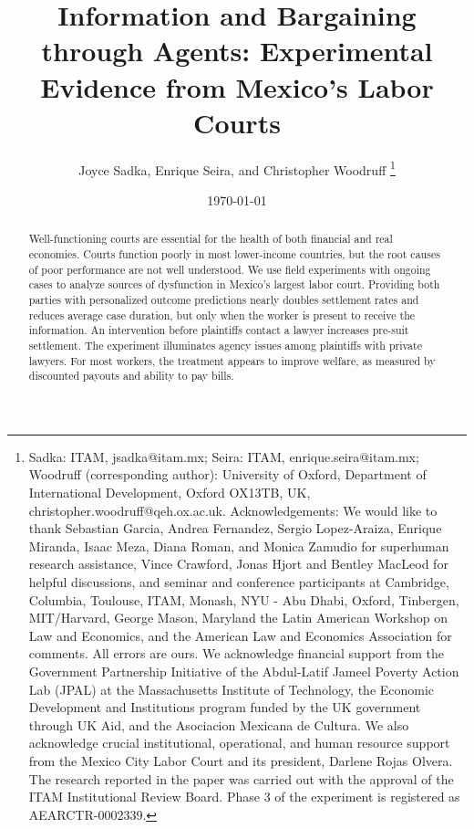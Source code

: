 \documentclass[11pt, a4paper]{article}
\begin{document}
\title{Information and Bargaining through Agents: Experimental Evidence from Mexico's Labor Courts}


\author{Joyce Sadka,  Enrique Seira, and Christopher Woodruff  \thanks{\protect\linespread{1}\protect\selectfont Sadka: ITAM, jsadka@itam.mx;  
Seira: ITAM, enrique.seira@itam.mx; Woodruff (corresponding author): University of Oxford, Department of International Development, Oxford OX13TB, UK, christopher.woodruff@qeh.ox.ac.uk. Acknowledgements: We would like to thank Sebastian Garcia, Andrea Fernandez, Sergio Lopez-Araiza, Enrique Miranda, Isaac Meza, Diana Roman, and Monica Zamudio for superhuman research assistance, Vince Crawford, Jonas Hjort and Bentley MacLeod for helpful discussions, and seminar and conference participants at Cambridge, Columbia, Toulouse, ITAM, Monash, NYU - Abu Dhabi, Oxford, Tinbergen, MIT/Harvard, George Mason, Maryland the Latin American Workshop on Law and Economics, and the American Law and Economics Association for comments. All errors are ours. We acknowledge financial support from the Government Partnership Initiative of the Abdul-Latif Jameel Poverty Action Lab (JPAL) at the Massachusetts Institute of Technology, the Economic Development and Institutions program funded by the UK government through UK Aid, and the Asociacion Mexicana de Cultura. We also acknowledge crucial institutional, operational, and human resource support from the Mexico City Labor Court and its president, Darlene Rojas Olvera. The research reported in the paper was carried out with the approval of the ITAM Institutional Review Board. Phase 3 of the experiment is registered as AEARCTR-0002339.}}


\date{\today}


\maketitle

\begin{abstract} Well-functioning courts are essential for the health of both financial and real economies. Courts function poorly in most lower-income countries, but the root causes of poor performance are not well understood. We use field experiments with ongoing cases to analyze sources of dysfunction in Mexico's largest labor court. Providing both parties with personalized outcome predictions nearly doubles settlement rates and reduces average case duration, but only when the worker is present to receive the information. An intervention before plaintiffs contact a lawyer increases pre-suit settlement. The experiment illuminates agency issues among plaintiffs with private lawyers. For most workers, the treatment appears to improve welfare, as measured by discounted payouts and ability to pay bills. 
\end{abstract}
\end{document}
